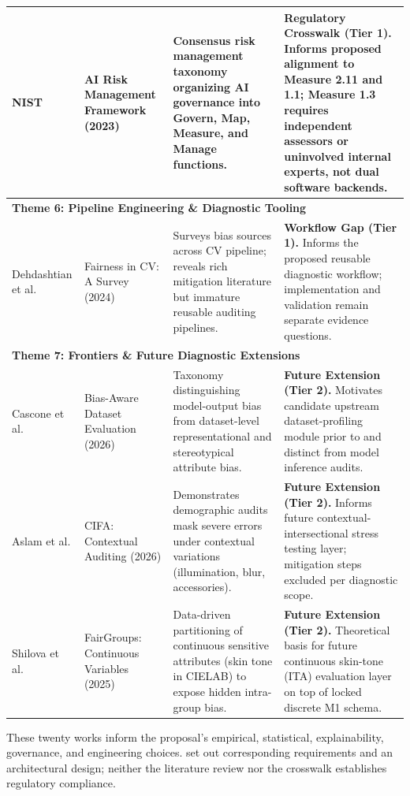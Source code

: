 \begin{center}
\begin{longtable}{|p{2.2cm}|p{2.6cm}|p{4.4cm}|p{4.4cm}|}
NIST \cite{nist2023aiframework} &
AI Risk Management Framework (2023) &
Consensus risk management taxonomy organizing AI governance into Govern, Map, Measure, and Manage functions. &
\textbf{Regulatory Crosswalk (Tier 1).} Informs proposed alignment to Measure 2.11 and 1.1; Measure 1.3 requires independent assessors or uninvolved internal experts, not dual software backends. \\
\hline

\multicolumn{4}{|l|}{\textbf{Theme 6: Pipeline Engineering \& Diagnostic Tooling}} \\
\hline
Dehdashtian et al. \cite{dehdashtian2024survey} &
Fairness in CV: A Survey (2024) &
Surveys bias sources across CV pipeline; reveals rich mitigation literature but immature reusable auditing pipelines. &
\textbf{Workflow Gap (Tier 1).} Informs the proposed reusable diagnostic workflow; implementation and validation remain separate evidence questions. \\
\hline

\multicolumn{4}{|l|}{\textbf{Theme 7: Frontiers \& Future Diagnostic Extensions}} \\
\hline
Cascone et al. \cite{cascone2026framework} &
Bias-Aware Dataset Evaluation (2026) &
Taxonomy distinguishing model-output bias from dataset-level representational and stereotypical attribute bias. &
\textbf{Future Extension (Tier 2).} Motivates candidate upstream dataset-profiling module prior to and distinct from model inference audits. \\
\hline

Aslam et al. \cite{aslam2026cifa} &
CIFA: Contextual Auditing (2026) &
Demonstrates demographic audits mask severe errors under contextual variations (illumination, blur, accessories). &
\textbf{Future Extension (Tier 2).} Informs future contextual-intersectional stress testing layer; mitigation steps excluded per diagnostic scope. \\
\hline

Shilova et al. \cite{shilova2025fairgroups} &
FairGroups: Continuous Variables (2025) &
Data-driven partitioning of continuous sensitive attributes (skin tone in CIELAB) to expose hidden intra-group bias. &
\textbf{Future Extension (Tier 2).} Theoretical basis for future continuous skin-tone (ITA) evaluation layer on top of locked discrete M1 schema. \\
\hline

\end{longtable}
\end{center}

These twenty works inform the proposal's empirical, statistical, explainability, governance, and engineering choices.  set out corresponding requirements and an architectural design; neither the literature review nor the crosswalk establishes regulatory compliance.

